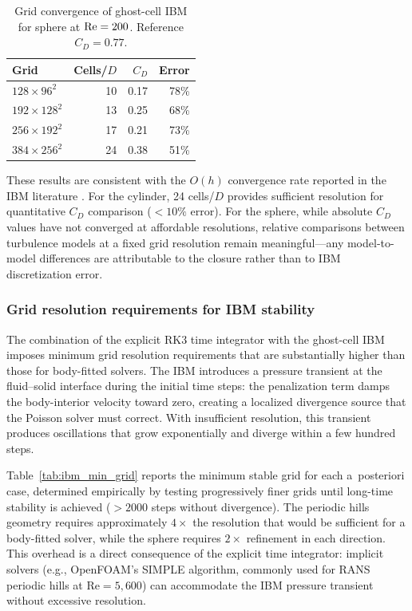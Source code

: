 \begin{table}[htbp]
\centering
\caption{Grid convergence of ghost-cell IBM for sphere at $\mathrm{Re} = 200$. Reference $C_D = 0.77$.}
\label{tab:ibm_convergence_sph}
\begin{tabular}{lrrr}
\toprule
Grid & Cells/$D$ & $C_D$ & Error \\
\midrule
$128 \times 96^2$  & 10 & 0.17 & 78\% \\
$192 \times 128^2$ & 13 & 0.25 & 68\% \\
$256 \times 192^2$ & 17 & 0.21 & 73\% \\
$384 \times 256^2$ & 24 & 0.38 & 51\% \\
\bottomrule
\end{tabular}
\end{table}

These results are consistent with the $O(h)$ convergence rate reported in the IBM literature \citep{Fadlun2000}.
For the cylinder, 24 cells/$D$ provides sufficient resolution for quantitative $C_D$ comparison (${<}10\%$ error).
For the sphere, while absolute $C_D$ values have not converged at affordable resolutions, relative comparisons between turbulence models at a fixed grid resolution remain meaningful---any model-to-model differences are attributable to the closure rather than to IBM discretization error.

\subsubsection{Grid resolution requirements for IBM stability}
\label{sec:ibm_grid_requirements}

The combination of the explicit RK3 time integrator with the ghost-cell IBM imposes minimum grid resolution requirements that are substantially higher than those for body-fitted solvers.
The IBM introduces a pressure transient at the fluid--solid interface during the initial time steps: the penalization term damps the body-interior velocity toward zero, creating a localized divergence source that the Poisson solver must correct.
With insufficient resolution, this transient produces oscillations that grow exponentially and diverge within a few hundred steps.

Table~\ref{tab:ibm_min_grid} reports the minimum stable grid for each a~posteriori case, determined empirically by testing progressively finer grids until long-time stability is achieved (${>}2000$ steps without divergence).
The periodic hills geometry requires approximately $4\times$ the resolution that would be sufficient for a body-fitted solver, while the sphere requires $2\times$ refinement in each direction.
This overhead is a direct consequence of the explicit time integrator: implicit solvers (e.g., OpenFOAM's SIMPLE algorithm, commonly used for RANS periodic hills at Re${=}5{,}600$) can accommodate the IBM pressure transient without excessive resolution.

